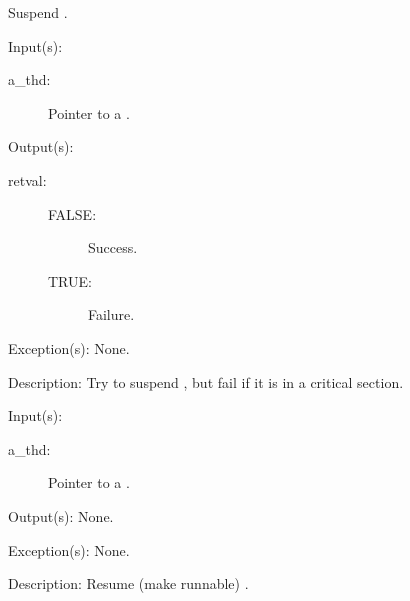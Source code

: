 \begin{capi}
\begin{capilist}
		Suspend .
	\end{capilist}
\label{thd_trysuspend}
	\begin{capilist}
	\item[Input(s): ]
		\begin{description}\item[]
		\item[a\_thd: ]
			Pointer to a .
		\end{description}
	\item[Output(s): ]
		\begin{description}\item[]
		\item[retval: ]
			\begin{description}\item[]
			\item[FALSE: ]
				Success.
			\item[TRUE: ]
				Failure.
			\end{description}
		\end{description}
	\item[Exception(s): ] None.
	\item[Description: ]
		Try to suspend , but fail if it is in a critical
		section.
	\end{capilist}
\label{thd_resume}
	\begin{capilist}
	\item[Input(s): ]
		\begin{description}\item[]
		\item[a\_thd: ]
			Pointer to a \classname{thd}.
		\end{description}
	\item[Output(s): ] None.
	\item[Exception(s): ] None.
	\item[Description: ]
		Resume (make runnable) \classname{a\_thd}.
	\end{capilist}
\end{capi}
